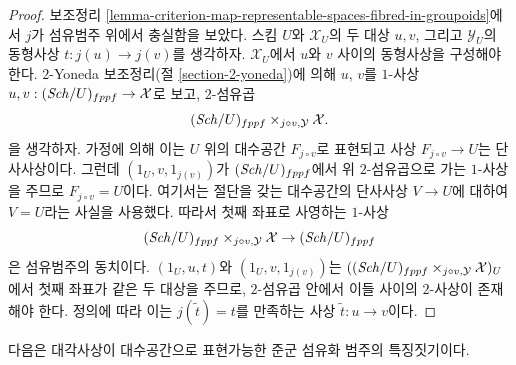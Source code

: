 \begin{proof}
보조정리 \ref{lemma-criterion-map-representable-spaces-fibred-in-groupoids}에서
$j$가 섬유범주 위에서 충실함을 보았다. 스킴 $U$와
$\mathcal{X}_U$의 두 대상 $u, v$, 그리고 $\mathcal{Y}_U$의 동형사상
$t : j(u) \to j(v)$를 생각하자. $\mathcal{X}_U$에서 $u$와 $v$ 사이의
동형사상을 구성해야 한다. $2$-Yoneda 보조정리(절
\ref{section-2-yoneda})에 의해 $u$, $v$를 $1$-사상
$u, v : (\mathit{Sch}/U)_{fppf} \to \mathcal{X}$로 보고, $2$-섬유곱
$$
(\mathit{Sch}/U)_{fppf} \times_{j \circ v, \mathcal{Y}} \mathcal{X}.
$$
을 생각하자. 가정에 의해 이는 $U$ 위의 대수공간 $F_{j \circ v}$로
표현되고 사상 $F_{j \circ v} \to U$는 단사사상이다. 그런데
$(1_U, v, 1_{j(v)})$가 $(\mathit{Sch}/U)_{fppf}$에서 위 $2$-섬유곱으로 가는
$1$-사상을 주므로 $F_{j \circ v} = U$이다. 여기서는 절단을 갖는
대수공간의 단사사상 $V \to U$에 대하여 $V = U$라는 사실을 사용했다.
따라서 첫째 좌표로 사영하는 $1$-사상
$$
(\mathit{Sch}/U)_{fppf} \times_{j \circ v, \mathcal{Y}} \mathcal{X}
\to (\mathit{Sch}/U)_{fppf}
$$
은 섬유범주의 동치이다. $(1_U, u, t)$와 $(1_U, v, 1_{j(v)})$는
$((\mathit{Sch}/U)_{fppf} \times_{j \circ v, \mathcal{Y}} \mathcal{X})_U$에서
첫째 좌표가 같은 두 대상을 주므로, $2$-섬유곱 안에서 이들 사이의
$2$-사상이 존재해야 한다. 정의에 따라 이는 $j(\tilde t) = t$를
만족하는 사상 $\tilde t : u \to v$이다.
\end{proof}

\noindent
다음은 대각사상이 대수공간으로 표현가능한 준군 섬유화 범주의
특징짓기이다.

